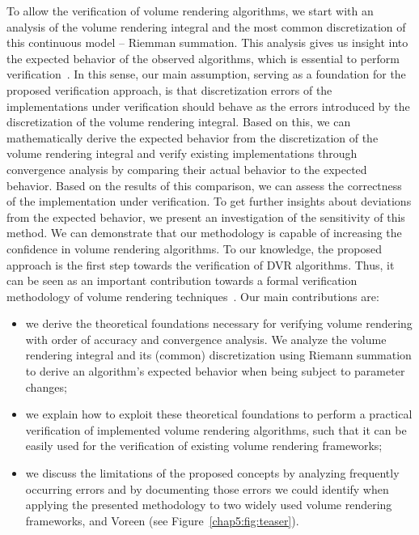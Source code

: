 To allow the verification of volume rendering algorithms, we start with an analysis of the volume rendering integral and the most common discretization of this continuous model -- Riemman summation. This analysis gives us insight into the expected behavior of the observed algorithms, which is essential to perform verification~\cite{159342}. In this sense, our main assumption, serving as a foundation for the proposed verification approach, is that discretization errors of the implementations under verification should behave as the errors introduced by 
the discretization of the volume rendering integral. 
Based on this, we can mathematically derive the expected behavior from the discretization of the volume rendering integral and verify existing implementations through convergence analysis by comparing their actual behavior to the expected behavior. 
%
Based on the results of this comparison, we can assess the correctness of the implementation under verification. To get further insights about deviations from the expected behavior, we present an investigation of the sensitivity of this method. 
%
We can demonstrate that our methodology is capable of increasing the confidence in volume rendering algorithms. To our knowledge, the proposed approach is the first step towards the verification of DVR algorithms. Thus, it can be seen as an important contribution towards a formal verification methodology of volume rendering techniques~\cite{roach98}.
%
Our main contributions are:
\begin{itemize}[topsep=0px,partopsep=0px,itemsep=0px,parsep=0px]
\item we derive the theoretical foundations necessary for verifying volume rendering with order of accuracy and convergence analysis. We analyze the volume rendering integral and its (common) discretization using Riemann summation to derive an algorithm's expected behavior when being subject to parameter changes;
\item we explain how to exploit these theoretical foundations to perform a practical verification of implemented volume rendering algorithms, such that it can be easily used for the verification of existing volume rendering frameworks;
\item we discuss the limitations of the proposed concepts by analyzing frequently occurring errors and by documenting those errors we could identify when applying the presented methodology to two widely used volume rendering frameworks, 
 \cite{vtk} and Voreen \cite{MRMH09} (see Figure~\ref{chap5:fig:teaser}).
\end{itemize}

